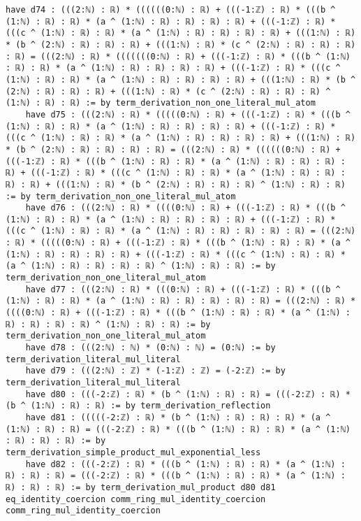 \documentclass{article}
\begin{document}
\begin{tcolorbox}[colback=white!10, width=\linewidth]
\begin{lstlisting}[language=Lean4]
    have d74 : (((2:ℕ) : ℝ) * ((((((0:ℕ) : ℝ) + (((-1:ℤ) : ℝ) * (((b ^ (1:ℕ) : ℝ) : ℝ) * (a ^ (1:ℕ) : ℝ) : ℝ) : ℝ) : ℝ) + (((-1:ℤ) : ℝ) * (((c ^ (1:ℕ) : ℝ) : ℝ) * (a ^ (1:ℕ) : ℝ) : ℝ) : ℝ) : ℝ) + (((1:ℕ) : ℝ) * (b ^ (2:ℕ) : ℝ) : ℝ) : ℝ) + (((1:ℕ) : ℝ) * (c ^ (2:ℕ) : ℝ) : ℝ) : ℝ) : ℝ) = (((2:ℕ) : ℝ) * (((((((0:ℕ) : ℝ) + (((-1:ℤ) : ℝ) * (((b ^ (1:ℕ) : ℝ) : ℝ) * (a ^ (1:ℕ) : ℝ) : ℝ) : ℝ) : ℝ) + (((-1:ℤ) : ℝ) * (((c ^ (1:ℕ) : ℝ) : ℝ) * (a ^ (1:ℕ) : ℝ) : ℝ) : ℝ) : ℝ) + (((1:ℕ) : ℝ) * (b ^ (2:ℕ) : ℝ) : ℝ) : ℝ) + (((1:ℕ) : ℝ) * (c ^ (2:ℕ) : ℝ) : ℝ) : ℝ) ^ (1:ℕ) : ℝ) : ℝ) := by term_derivation_non_one_literal_mul_atom
    have d75 : (((2:ℕ) : ℝ) * (((((0:ℕ) : ℝ) + (((-1:ℤ) : ℝ) * (((b ^ (1:ℕ) : ℝ) : ℝ) * (a ^ (1:ℕ) : ℝ) : ℝ) : ℝ) : ℝ) + (((-1:ℤ) : ℝ) * (((c ^ (1:ℕ) : ℝ) : ℝ) * (a ^ (1:ℕ) : ℝ) : ℝ) : ℝ) : ℝ) + (((1:ℕ) : ℝ) * (b ^ (2:ℕ) : ℝ) : ℝ) : ℝ) : ℝ) = (((2:ℕ) : ℝ) * ((((((0:ℕ) : ℝ) + (((-1:ℤ) : ℝ) * (((b ^ (1:ℕ) : ℝ) : ℝ) * (a ^ (1:ℕ) : ℝ) : ℝ) : ℝ) : ℝ) + (((-1:ℤ) : ℝ) * (((c ^ (1:ℕ) : ℝ) : ℝ) * (a ^ (1:ℕ) : ℝ) : ℝ) : ℝ) : ℝ) + (((1:ℕ) : ℝ) * (b ^ (2:ℕ) : ℝ) : ℝ) : ℝ) ^ (1:ℕ) : ℝ) : ℝ) := by term_derivation_non_one_literal_mul_atom
    have d76 : (((2:ℕ) : ℝ) * ((((0:ℕ) : ℝ) + (((-1:ℤ) : ℝ) * (((b ^ (1:ℕ) : ℝ) : ℝ) * (a ^ (1:ℕ) : ℝ) : ℝ) : ℝ) : ℝ) + (((-1:ℤ) : ℝ) * (((c ^ (1:ℕ) : ℝ) : ℝ) * (a ^ (1:ℕ) : ℝ) : ℝ) : ℝ) : ℝ) : ℝ) = (((2:ℕ) : ℝ) * (((((0:ℕ) : ℝ) + (((-1:ℤ) : ℝ) * (((b ^ (1:ℕ) : ℝ) : ℝ) * (a ^ (1:ℕ) : ℝ) : ℝ) : ℝ) : ℝ) + (((-1:ℤ) : ℝ) * (((c ^ (1:ℕ) : ℝ) : ℝ) * (a ^ (1:ℕ) : ℝ) : ℝ) : ℝ) : ℝ) ^ (1:ℕ) : ℝ) : ℝ) := by term_derivation_non_one_literal_mul_atom
    have d77 : (((2:ℕ) : ℝ) * (((0:ℕ) : ℝ) + (((-1:ℤ) : ℝ) * (((b ^ (1:ℕ) : ℝ) : ℝ) * (a ^ (1:ℕ) : ℝ) : ℝ) : ℝ) : ℝ) : ℝ) = (((2:ℕ) : ℝ) * ((((0:ℕ) : ℝ) + (((-1:ℤ) : ℝ) * (((b ^ (1:ℕ) : ℝ) : ℝ) * (a ^ (1:ℕ) : ℝ) : ℝ) : ℝ) : ℝ) ^ (1:ℕ) : ℝ) : ℝ) := by term_derivation_non_one_literal_mul_atom
    have d78 : (((2:ℕ) : ℕ) * (0:ℕ) : ℕ) = (0:ℕ) := by term_derivation_literal_mul_literal
    have d79 : (((2:ℕ) : ℤ) * (-1:ℤ) : ℤ) = (-2:ℤ) := by term_derivation_literal_mul_literal
    have d80 : (((-2:ℤ) : ℝ) * (b ^ (1:ℕ) : ℝ) : ℝ) = (((-2:ℤ) : ℝ) * (b ^ (1:ℕ) : ℝ) : ℝ) := by term_derivation_reflection
    have d81 : (((((-2:ℤ) : ℝ) * (b ^ (1:ℕ) : ℝ) : ℝ) : ℝ) * (a ^ (1:ℕ) : ℝ) : ℝ) = (((-2:ℤ) : ℝ) * (((b ^ (1:ℕ) : ℝ) : ℝ) * (a ^ (1:ℕ) : ℝ) : ℝ) : ℝ) := by term_derivation_simple_product_mul_exponential_less
    have d82 : (((-2:ℤ) : ℝ) * (((b ^ (1:ℕ) : ℝ) : ℝ) * (a ^ (1:ℕ) : ℝ) : ℝ) : ℝ) = (((-2:ℤ) : ℝ) * (((b ^ (1:ℕ) : ℝ) : ℝ) * (a ^ (1:ℕ) : ℝ) : ℝ) : ℝ) := by term_derivation_mul_product d80 d81 eq_identity_coercion comm_ring_mul_identity_coercion comm_ring_mul_identity_coercion

\end{lstlisting}
\end{tcolorbox}
\end{document}

